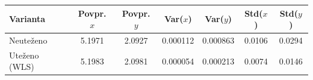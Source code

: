 \begin{tabular}{|l|c|c|c|c|c|c|}\hline
Varianta & Povpr. $x$ & Povpr. $y$ & Var($x$) & Var($y$) & Std($x$) & Std($y$) \\\hline
Neute\v{z}eno & 5.1971 & 2.0927 & 0.000112 & 0.000863 & 0.0106 & 0.0294 \\
Ute\v{z}eno (WLS) & 5.1983 & 2.0981 & 0.000054 & 0.000213 & 0.0074 & 0.0146 \\
\hline\end{tabular}

